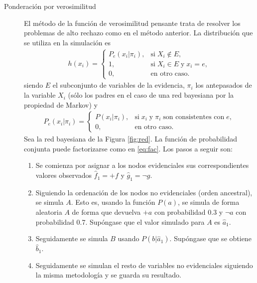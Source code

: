 \documentclass[12pt,a4paper]{article}
\begin{document}
\begin{description}
    \item[Ponderación por verosimilitud] El método de la función de verosimilitud pensante trata de resolver los problemas de alto rechazo como en el método anterior. La distribución que se utiliza en la simulación es
    \begin{align*}
        h(x_i) = \left\{
            \begin{array}{ll}
                P_e(x_i | \pi_i), &  \text{si} \; X_i \notin E,\\
                1, & \text{si} \; X_i \in E \; \text{y} \; x_i = e, \\
                0, & \text{en otro caso.} 
            \end{array}
        \right.
    \end{align*}
    siendo $E$ el subconjunto de variables de la evidencia, $\pi_i$ los antepasados de la variable $X_i$ (sólo los padres en el caso de una red bayesiana por la propiedad de Markov) y 
    \begin{align*}
        P_e(x_i | \pi_i) = \left\{
            \begin{array}{ll}
                P(x_i | \pi_i), & \text{si} \; x_i \; \text{y} \; \pi_i \; \text{son consistentes con} \; e, \\
                0, & \text{en otro caso.}
            \end{array}
            \right.
    \end{align*}
    Sea la red bayesiana de la Figura \ref{fig:red}. La función de probabilidad conjunta puede factorizarse como en \eqref{eq:fac}. Los pasos a seguir son:
    \begin{enumerate}
        \item Se comienza por asignar a los nodos evidenciales sus correspondientes valores observados $\hat{f}_1 = + f$ y $\hat{g}_1 = \neg g$. 
        \item Siguiendo la ordenación de los nodos no evidenciales (orden ancestral), se simula $A$. Esto es, usando la función $P(a)$, se simula de forma aleatoria $A$ de forma que devuelva $+a$ con probabilidad 0.3 y $\neg a$ con probabilidad 0.7. Supóngase que el valor simulado para $A$ es $\hat{a}_1$.
        \item Seguidamente se simula $B$ usando $P(b | \hat{a}_1)$. Supóngase que se obtiene $\hat{b}_1$.
        \item Seguidamente se simulan el resto de variables no evidenciales siguiendo la misma metodología y se guarda su resultado.
    \end{enumerate}

\end{description}
\end{document}

